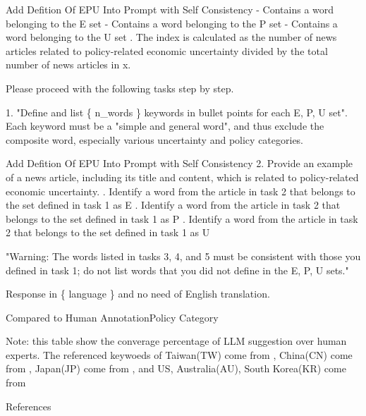 \documentclass[12pt]{beamer}
\begin{document}
\begin{frame}{Add Defition Of EPU Into Prompt with Self Consistency}
- Contains a word belonging to the E set \newline
- Contains a word belonging to the P set \newline
- Contains a word belonging to the U set . The index is calculated as the number of news articles related to
    policy-related economic uncertainty divided by the total number of news
    articles in x. \newline

Please proceed with the following tasks step by step. \newline

1. "Define and list \{ n\_words \} keywords in bullet points for each E, P, U
    set". Each keyword must be a "simple and general word", and thus exclude
    the composite word, especially various uncertainty and policy categories.
\end{frame}


\begin{frame}{Add Defition Of EPU Into Prompt with Self Consistency}
2. Provide an example of a news article, including its title and content,
    which is related to policy-related economic uncertainty. . Identify a word from the article in task 2 that belongs to the set
    defined in task 1 as E . Identify a word from the article in task 2 that belongs to the set
    defined in task 1 as P . Identify a word from the article in task 2 that belongs to the set
    defined in task 1 as U \newline

"Warning: The words listed in tasks 3, 4, and 5 must be consistent with those
you defined in task 1; do not list words that you did not define in the
E, P, U sets." \newline

Response in \{ language \}  and no need of English translation.
\end{frame}


\begin{frame}{Compared to Human Annotation}{Policy Category}
\begin{table}[H]
\renewcommand\arraystretch{1.4}
\begin{adjustwidth}{-0.0cm}{}
\begin{center}
\setlength{\tabcolsep}{10pt}
{
    \fontsize{12}{12} \selectfont
    
}
\end{center}
\end{adjustwidth}
{\tiny
    Note: this table show the converage percentage of LLM suggestion over
    human experts. The referenced keywoeds of Taiwan(TW) come from
    \cite{Chen2024}, China(CN) come from \cite{Huang2020}, Japan(JP) come from
    \cite{ArbatliSaxegaard2022}, and US, Australia(AU), South Korea(KR) come
    from \cite{Baker2016}
    \cite{}
}
\end{table}
\end{frame}

\begin{frame}{References}

\end{frame}
\end{document}
